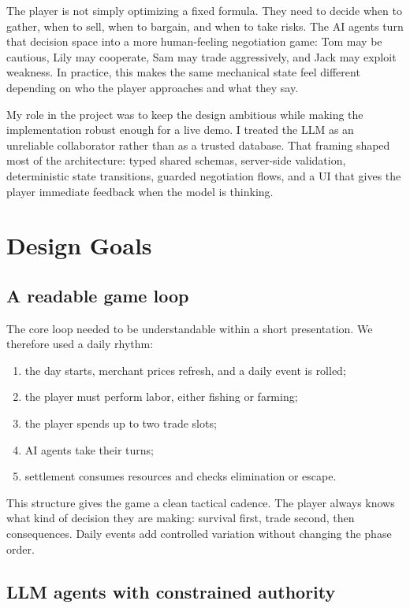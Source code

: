 \documentclass[11pt]{article}
\begin{document}
The player is not simply optimizing a fixed formula. They need to decide when
to gather, when to sell, when to bargain, and when to take risks. The AI agents
turn that decision space into a more human-feeling negotiation game: Tom may be
cautious, Lily may cooperate, Sam may trade aggressively, and Jack may exploit
weakness. In practice, this makes the same mechanical state feel different
depending on who the player approaches and what they say.

My role in the project was to keep the design ambitious while making the
implementation robust enough for a live demo. I treated the LLM as an
unreliable collaborator rather than as a trusted database. That framing shaped
most of the architecture: typed shared schemas, server-side validation,
deterministic state transitions, guarded negotiation flows, and a UI that gives
the player immediate feedback when the model is thinking.

\section{Design Goals}

\subsection{A readable game loop}

The core loop needed to be understandable within a short presentation. We
therefore used a daily rhythm:

\begin{enumerate}
  \item the day starts, merchant prices refresh, and a daily event is rolled;
  \item the player must perform labor, either fishing or farming;
  \item the player spends up to two trade slots;
  \item AI agents take their turns;
  \item settlement consumes resources and checks elimination or escape.
\end{enumerate}

This structure gives the game a clean tactical cadence. The player always knows
what kind of decision they are making: survival first, trade second, then
consequences. Daily events add controlled variation without changing the phase
order.

\subsection{LLM agents with constrained authority}
\end{document}
